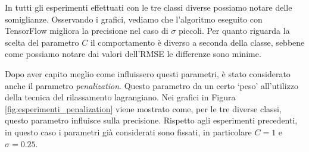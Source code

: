 \documentclass[a4paper,12pt]{report}
\begin{document}
\noindent In tutti gli esperimenti effettuati con le tre classi diverse possiamo notare delle somiglianze. Osservando i grafici, vediamo che l'algoritmo eseguito con TensorFlow migliora la precisione nel caso di $\sigma$ piccoli. Per quanto riguarda la scelta del parametro $C$ il comportamento è diverso a seconda della classe, sebbene come possiamo notare dai valori dell'RMSE le differenze sono minime.


Dopo aver capito meglio come influissero questi parametri, è stato considerato anche il parametro \textit{penalization}. Questo parametro da un certo `peso' all'utilizzo della tecnica del rilassamento lagrangiano. Nei grafici in Figura \ref{fig:esperimenti_penalization} viene mostrato come, per le tre diverse classi, questo parametro influisce sulla precisione. Rispetto agli esperimenti precedenti, in questo caso i parametri già considerati sono fissati, in particolare $C=1$ e $\sigma=0.25$. 
\end{document}
